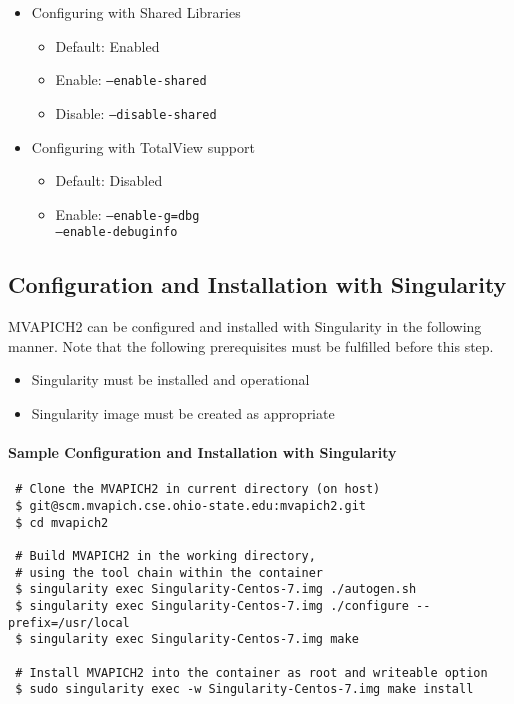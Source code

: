 \begin{itemize}
	\item Configuring with Shared Libraries
		\begin{itemize}
			\item Default: Enabled
			\item Enable: \texttt{--enable-shared}
            \item Disable: \texttt{--disable-shared}
		\end{itemize}

	\item Configuring with TotalView support
		\begin{itemize}
			\item Default: Disabled
			\item Enable: \texttt{--enable-g=dbg \\
                                   --enable-debuginfo}
		\end{itemize}
\end{itemize}

\subsection{Configuration and Installation with Singularity}
\label{subsec:config-install-singularity}

MVAPICH2 can be configured and installed with Singularity in the following
manner. Note that the following prerequisites must be fulfilled before this
step.

\begin{itemize}
    \item{Singularity must be installed and operational}
    \item{Singularity image must be created as appropriate}
\end{itemize}

\paragraph{Sample Configuration and Installation with Singularity}
\begin{verbatim}
 # Clone the MVAPICH2 in current directory (on host)
 $ git@scm.mvapich.cse.ohio-state.edu:mvapich2.git
 $ cd mvapich2

 # Build MVAPICH2 in the working directory, 
 # using the tool chain within the container
 $ singularity exec Singularity-Centos-7.img ./autogen.sh
 $ singularity exec Singularity-Centos-7.img ./configure --prefix=/usr/local
 $ singularity exec Singularity-Centos-7.img make

 # Install MVAPICH2 into the container as root and writeable option
 $ sudo singularity exec -w Singularity-Centos-7.img make install
\end{verbatim}

